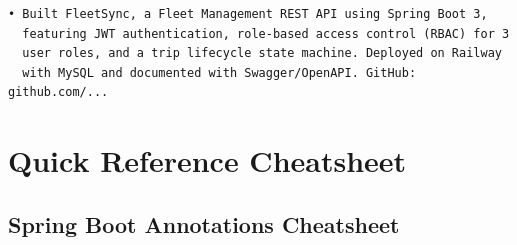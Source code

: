 \documentclass[12pt,a4paper]{report}
\begin{document}
\begin{lstlisting}[style=bashstyle,caption=Resume bullet point for FleetSync]
• Built FleetSync, a Fleet Management REST API using Spring Boot 3,
  featuring JWT authentication, role-based access control (RBAC) for 3
  user roles, and a trip lifecycle state machine. Deployed on Railway
  with MySQL and documented with Swagger/OpenAPI. GitHub: github.com/...
\end{lstlisting}

\chapter{Quick Reference Cheatsheet}

\section{Spring Boot Annotations Cheatsheet}
\end{document}
